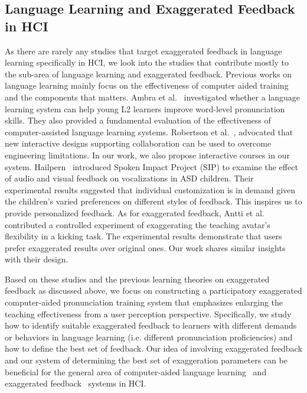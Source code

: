 \documentclass[sigconf]{acmart}
\begin{document}
\subsection{Language Learning and Exaggerated Feedback in HCI}
\label{sec:2.2}
As there are rarely any studies that target exaggerated feedback in language learning specifically in HCI, we look into the studies that contribute mostly to the sub-area of language learning and exaggerated feedback.
%
Previous works on language learning mainly focus on the effectiveness of computer aided training and the components that matters. Ambra et al.~\cite{neri2008effectiveness} investigated whether a language learning system can help young L2 learners improve word-level pronunciation skills. They also provided a fundamental evaluation of the effectiveness of computer-assisted language learning systems. Robertson et al.~\cite{robertson2018designing}, advocated that new interactive designs supporting collaboration can be used to overcome engineering limitations. In our work, we also propose interactive courses in our system. Hailpern~\cite{hailpern2009creating} introduced Spoken Impact Project (SIP) to examine the effect of audio and visual feedback on vocalizations in ASD children. Their experimental results suggested that individual customization is in demand given the children’s varied preferences on different styles of feedback. This inspires us to provide personalized feedback. As for exaggerated feedback, Antti et al.~\cite{granqvist2018exaggeration} contributed a controlled experiment of exaggerating the teaching avatar’s flexibility in a kicking task. The experimental results demonstrate that users prefer exaggerated results over original ones. Our work shares similar insights with their design.

Based on these studies and the previous learning theories on exaggerated feedback as discussed above, we focus on constructing a participatory exaggerated computer-aided pronunciation training system that emphasizes enlarging the teaching effectiveness from a user perception perspective. Specifically, we study how to identify suitable exaggerated feedback to learners with different demands or behaviors in language learning (i.e. different pronunciation proficiencies) and how to define the best set of feedback. Our idea of involving exaggerated feedback and our system of determining the best set of exaggeration parameters can be beneficial for the general area of computer-aided language learning~\cite{garcia2018self, neri2008effectiveness, robertson2018designing, hailpern2009creating} and exaggerated feedback~\cite{granqvist2018exaggeration} systems in HCI.
\end{document}

